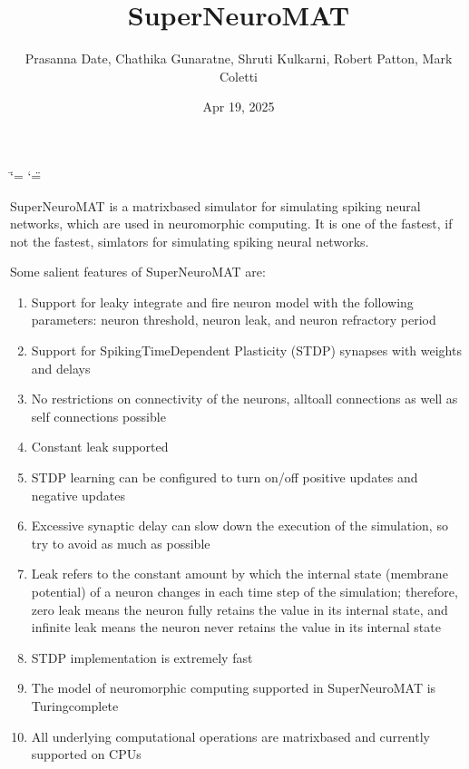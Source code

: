\documentclass[letterpaper,10pt,english]{sphinxmanual}
\title{SuperNeuroMAT}
\date{Apr 19, 2025}
\author{Prasanna Date, Chathika Gunaratne, Shruti Kulkarni, Robert Patton, Mark Coletti}
\begin{document}
\ifdefined\shorthandoff
  \ifnum\catcode`\=\string=\active\shorthandoff{=}\fi
  \ifnum\catcode`\"=\active{}\fi
\fi

\pagestyle{empty}
\sphinxmaketitle
\pagestyle{plain}
\sphinxtableofcontents
\pagestyle{normal}
\label{\detokenize{index::doc}}


\sphinxAtStartPar
SuperNeuroMAT is a matrix\sphinxhyphen{}based simulator for simulating spiking neural networks, which are used in neuromorphic computing. It is one of the fastest, if not the fastest, simlators for simulating spiking neural networks.

\sphinxAtStartPar
Some salient features of SuperNeuroMAT are:
\begin{enumerate}
%
\item {} 
\sphinxAtStartPar
Support for leaky integrate and fire neuron model with the following parameters: neuron threshold, neuron leak, and neuron refractory period

\item {} 
\sphinxAtStartPar
Support for Spiking\sphinxhyphen{}Time\sphinxhyphen{}Dependent Plasticity (STDP) synapses with weights and delays

\item {} 
\sphinxAtStartPar
No restrictions on connectivity of the neurons, all\sphinxhyphen{}to\sphinxhyphen{}all connections as well as self connections possible

\item {} 
\sphinxAtStartPar
Constant leak supported

\item {} 
\sphinxAtStartPar
STDP learning can be configured to turn on/off positive updates and negative updates

\item {} 
\sphinxAtStartPar
Excessive synaptic delay can slow down the execution of the simulation, so try to avoid as much as possible

\item {} 
\sphinxAtStartPar
Leak refers to the constant amount by which the internal state (membrane potential) of a neuron changes in each time step of the simulation; therefore, zero leak means the neuron fully retains the value in its internal state, and infinite leak means the neuron never retains the value in its internal state

\item {} 
\sphinxAtStartPar
STDP implementation is extremely fast

\item {} 
\sphinxAtStartPar
The model of neuromorphic computing supported in SuperNeuroMAT is Turing\sphinxhyphen{}complete

\item {} 
\sphinxAtStartPar
All underlying computational operations are matrix\sphinxhyphen{}based and currently supported on CPUs

\end{enumerate}
\end{document}
